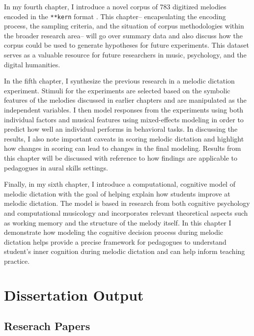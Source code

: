 \documentclass[]{book}
\begin{document}
In my fourth chapter, I introduce a novel corpus of 783 digitized melodies encoded in the \texttt{**kern}
format \citep{huronHumdrumToolkitReference1994}.
This chapter-- encapsulating the encoding process, the sampling criteria, and the situation of corpus methodologies within the broader research area-- will go over summary data and also discuss how the corpus could be used to generate hypotheses for future experiments.
This dataset serves as a valuable resource for future researchers in music, psychology, and the digital humanities.

In the fifth chapter, I synthesize the previous research in a melodic dictation experiment.
Stimuli for the experiments are selected based on the symbolic features of the melodies discussed in earlier chapters and are manipulated as the independent variables.
I then model responses from the experiments using both individual factors and musical features using mixed-effects modeling in order to predict how well an individual performs in behavioral tasks.
In discussing the results, I also note important caveats in scoring melodic dictation and highlight how changes in scoring can lead to changes in the final modeling.
Results from this chapter will be discussed with reference to how findings are applicable to pedagogues in aural skills settings.

Finally, in my sixth chapter, I introduce a computational, cognitive model of melodic dictation with the goal of helping explain how students improve at melodic dictation.
The model is based in research from both cognitive psychology \citep{cowanMagicalMysteryFour2010} and computational musicology \citep{pearceStatisticalLearningProbabilistic2018a} and incorporates relevant theoretical aspects such as working memory \citep{chenetteReframingAuralSkills2019, vanhandelRoleWorkingMemory2011} and the structure of the melody itself.
In this chapter I demonstrate how modeling the cognitive decision process during melodic dictation helps provide a precise framework for pedagogues to understand student's inner cognition during melodic dictation and can help inform teaching practice.

\hypertarget{dissertation-output}{%
\section{Dissertation Output}\label{dissertation-output}}

\hypertarget{reserach-papers}{%
\subsection{Reserach Papers}\label{reserach-papers}}
\end{document}
